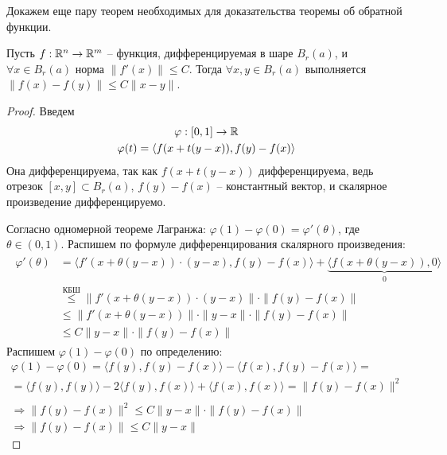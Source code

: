 Докажем еще пару теорем необходимых для доказательства теоремы об обратной функции.
\begin{theorem}
    Пусть $f: \mathbb{R}^n \to \mathbb{R}^m$ -- функция, дифференцируемая в шаре $B_r(a)$, и $\forall x \in B_r(a)$ норма $\| f'(x) \| \leqslant C$. 
    Тогда $\forall x, y \in B_r(a)$ выполняется $\| f(x) - f(y) \| \leqslant C \| x - y \|$.
\end{theorem}
\begin{proof}
    Введем \begin{gather*}
        \varphi:[0, 1] \to \mathbb{R} \\
        \varphi(t) = \langle f(x + t(y - x)), f(y) - f(x) \rangle    
    \end{gather*}
    Она дифференцируема, так как $f(x + t(y - x))$ дифференцируема, ведь отрезок $[x, y] \subset B_r(a)$, $f(y) - f(x)$ -- константный вектор, и скалярное произведение дифференцируемо.

    \quad Согласно одномерной теореме Лагранжа: $\varphi(1) - \varphi(0) = \varphi'(\theta)$, где $\theta \in (0, 1)$. 
    Распишем по формуле дифференцирования скалярного произведения: \begin{gather*}
        \begin{split}
            \varphi'(\theta) &= \langle f'(x + \theta(y - x))\cdot(y - x), f(y) - f(x) \rangle + \underbrace{\langle f(x + \theta(y - x)), 0 \rangle}_0  \\
            &\overset{\text{КБШ}}{\leqslant} \| f'(x + \theta(y - x))\cdot(y - x) \| \cdot \| f(y) - f(x) \| \\
            &\leqslant \| f'(x + \theta(y - x))\| \cdot \| y - x \| \cdot \| f(y) - f(x) \| \\
            &\leqslant C\| y - x \| \cdot \| f(y) - f(x) \|
        \end{split}
    \end{gather*}
    \quad Распишем $\varphi(1) - \varphi(0)$ по определению: \begin{gather*}
        \varphi(1) - \varphi(0) = \langle f(y), f(y) - f(x) \rangle - \langle f(x), f(y) - f(x) \rangle = \\
        = \langle f(y), f(y) \rangle - 2 \langle f(y), f(x) \rangle +  \langle f(x), f(x) \rangle = \| f(y) - f(x) \|^2 \\ \\
        \Rightarrow \| f(y) - f(x) \|^2 \leqslant C \| y - x \| \cdot \| f(y) - f(x) \| \\
        \Rightarrow \| f(y) - f(x) \| \leqslant C \| y - x \|
    \end{gather*} 
\end{proof}

